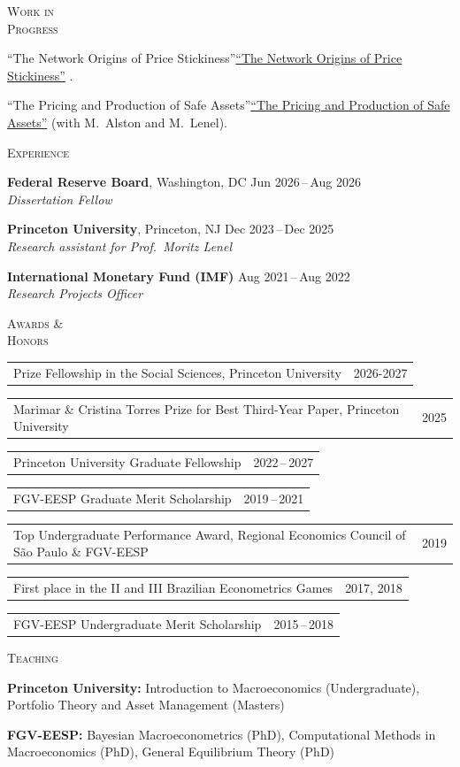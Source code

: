 \documentclass[11pt, letterpaper]{article}
\makeatletter
\newlength{\seclabelwidth}
\newenvironment{cvsection}[1]{%
  \vspace{1.2em}%
  \noindent\begin{minipage}[t]{\seclabelwidth}%
    \raggedright\textsc{#1}%
  \end{minipage}%
  \hspace{0.8em}%
  \begin{minipage}[t]{\dimexpr\textwidth-\seclabelwidth-0.8em}%
}{%
  \end{minipage}\par%
}
\newcommand{\paper}[3][]{%
  \def\tempurl{#1}%
  \ifx\tempurl\empty``#2''\else\href{#1}{``#2''}\fi#3%
}
\newcommand{\subentry}[2]{%
  \begin{tabularx}{\linewidth}{@{}X@{\hspace{0.5em}} r@{}}
    #1 & #2
  \end{tabularx}%
}
\makeatother
\begin{document}
\begin{cvsection}{Work in\\Progress}
  \paper{The Network Origins of Price Stickiness}{}.

  \vspace{0.7em}

  \paper{The Pricing and Production of Safe Assets}{} (with M.\ Alston and M.\ Lenel).
\end{cvsection}

\begin{cvsection}{Experience}
  \textbf{Federal Reserve Board}, Washington, DC \hfill Jun 2026\,--\,Aug 2026 \\
  \textit{Dissertation Fellow}

  \vspace{0.7em}

  \textbf{Princeton University}, Princeton, NJ \hfill Dec 2023\,--\,Dec 2025 \\
  \textit{Research assistant for Prof.\ Moritz Lenel}

  \vspace{0.7em}

  \textbf{International Monetary Fund (IMF)} \hfill Aug 2021\,--\,Aug 2022 \\
  \textit{Research Projects Officer}
\end{cvsection}

\begin{cvsection}{Awards \&\\Honors}
  \subentry{Prize Fellowship in the Social Sciences, Princeton University}{2026-2027}
  \subentry{Marimar \& Cristina Torres Prize for Best Third-Year Paper, Princeton University}{2025}
  \subentry{Princeton University Graduate Fellowship}{2022\,--\,2027}
  \subentry{FGV-EESP Graduate Merit Scholarship}{2019\,--\,2021}
  \subentry{Top Undergraduate Performance Award, Regional Economics Council of S\~{a}o Paulo \& FGV-EESP}{2019}
  \subentry{First place in the II and III Brazilian Econometrics Games}{2017, 2018}
  \subentry{FGV-EESP Undergraduate Merit Scholarship}{2015\,--\,2018}
\end{cvsection}

\begin{cvsection}{Teaching}
  \textbf{Princeton University:} Introduction to Macroeconomics (Undergraduate), Portfolio Theory and Asset Management (Masters)

  \vspace{0.5em}

  \textbf{FGV-EESP:} Bayesian Macroeconometrics (PhD), Computational Methods in Macroeconomics (PhD), General Equilibrium Theory (PhD)
\end{cvsection}
\end{document}
